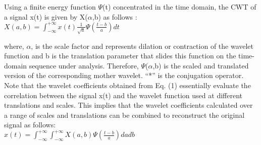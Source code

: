 Using a finite energy function $\Psi$(t) concentrated in the time domain, the CWT of 
a signal x(t) is given by X($\alpha$,b) as follows \cite{WaveletFilter1992}:\\

$X(a,b) = \int_{-\infty}^{+\infty}x(t)\frac{1}{\sqrt{a}} \Psi (\frac{t-b}{a}) dt$\newline

where, $\alpha$, is the scale factor and represents dilation or contraction of the wavelet 
function and b is the translation parameter that slides this function on the 
time-domain sequence under analysis. Therefore, $\Psi$($\alpha$,b) is the scaled and translated 
version of the corresponding mother wavelet. “*” is the conjugation operator.\\

Note that the wavelet coefficients obtained from Eq. (1) essentially evaluate the 
correlation between the signal x(t) and the wavelet function used at different 
translations and scales. This implies that the wavelet coefficients calculated 
over a range of scales and translations can be combined to reconstruct the original 
signal as follows:\\

$x(t) = \int_{-\infty}^{+\infty} \int_{-\infty}^{+\infty} X(a,b) \Psi (\frac{t-b}{a}) dadb$\newline

